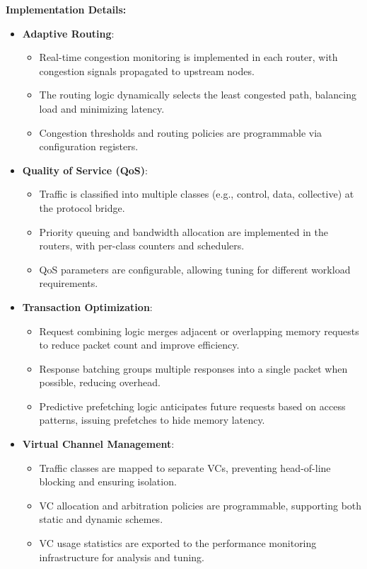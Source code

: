 \documentclass[11pt,a4paper]{article}
\begin{document}
\textbf{Implementation Details:}
\begin{itemize}
    \item \textbf{Adaptive Routing}:
    \begin{itemize}
        \item Real-time congestion monitoring is implemented in each router, with congestion signals propagated to upstream nodes.
        \item The routing logic dynamically selects the least congested path, balancing load and minimizing latency.
        \item Congestion thresholds and routing policies are programmable via configuration registers.
    \end{itemize}
    \item \textbf{Quality of Service (QoS)}:
    \begin{itemize}
        \item Traffic is classified into multiple classes (e.g., control, data, collective) at the protocol bridge.
        \item Priority queuing and bandwidth allocation are implemented in the routers, with per-class counters and schedulers.
        \item QoS parameters are configurable, allowing tuning for different workload requirements.
    \end{itemize}
    \item \textbf{Transaction Optimization}:
    \begin{itemize}
        \item Request combining logic merges adjacent or overlapping memory requests to reduce packet count and improve efficiency.
        \item Response batching groups multiple responses into a single packet when possible, reducing overhead.
        \item Predictive prefetching logic anticipates future requests based on access patterns, issuing prefetches to hide memory latency.
    \end{itemize}
    \item \textbf{Virtual Channel Management}:
    \begin{itemize}
        \item Traffic classes are mapped to separate VCs, preventing head-of-line blocking and ensuring isolation.
        \item VC allocation and arbitration policies are programmable, supporting both static and dynamic schemes.
        \item VC usage statistics are exported to the performance monitoring infrastructure for analysis and tuning.

\end{itemize}
\end{itemize}
\end{document}
